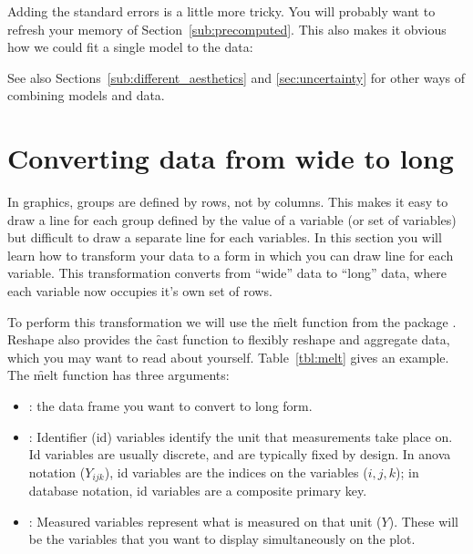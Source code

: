 % 


Adding the standard errors is a little more tricky.  You will probably want to refresh your memory of Section~\ref{sub:precomputed}.  This also makes it obvious how we could fit a single model to the data:

% 


See also Sections~\ref{sub:different_aesthetics} and \ref{sec:uncertainty} for other ways of combining models and data.

\section{Converting data from wide to long}
\label{sec:melting}

In \ggplot graphics, groups are defined by rows, not by columns.  This makes it easy to draw a line for each group defined by the value of a variable (or set of variables) but difficult to draw a separate line for each variables.  In this section you will learn how to transform your data to a form in which you can draw line for each variable.  This transformation converts from ``wide'' data to ``long'' data, where each variable now occupies it's own set of rows.

To perform this transformation we will use the \f{melt} function from the  package \citep{wickham:2007b}.  Reshape also provides the \f{cast} function to flexibly reshape and aggregate data, which you may want to read about yourself.   Table~\ref{tbl:melt} gives an example.  The \f{melt} function has three arguments:

\begin{itemize}
  \item {}: the data frame you want to convert to long form.

  \item {}: Identifier (id) variables identify the unit that measurements take place on.  Id variables are usually discrete, and are typically fixed by design.  In {\sc anova} notation ($Y_{ijk}$), id variables are the indices on the variables ($i, j, k$); in database notation, id variables are a composite primary key.

  \item {}: Measured variables represent what is measured on that unit ($Y$).  These will be the variables that you want to display simultaneously on the plot.
\end{itemize}

